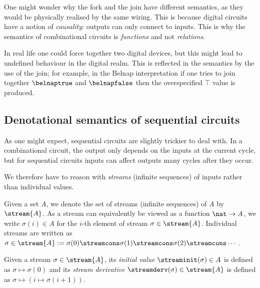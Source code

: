 \begin{remark}
    One might wonder why the fork and the join have different semantics, as they
    would be physically realised by the same wiring.
    This is because digital circuits have a notion of \emph{causality}: outputs
    can only connect to inputs.
    This is why the semantics of combinational circuits is \emph{functions} and
    not \emph{relations}.

    In real life one could force together two digital devices, but this might
    lead to undefined behaviour in the digital realm.
    This is reflected in the semantics by the use of the join; for example, in
    the Belnap interpretation if one tries to join together \(\belnaptrue\) and
    \(\belnapfalse\) then the overspecified \(\top\) value is produced.
\end{remark}

\subsection{Denotational semantics of sequential circuits}

As one might expect, sequential circuits are slightly trickier to deal with.
In a combinational circuit, the output only depends on the inputs at the current
cycle, but for sequential circuits inputs can affect outputs many cycles after
they occur.

We therefore have to reason with \emph{streams} (infinite sequences) of inputs
rather than individual values.

\begin{notation}
    Given a set \(A\), we denote the set of streams (infinite sequences) of
    \(A\) by \(\stream{A}\).
    As a stream can equivalently be viewed as a function \(\nat \to A\), we
    write \(\sigma(i) \in A\) for the \(i\)-th element of stream
    \(\sigma \in \stream{A}\).
    Individual streams are written as \(
        \sigma \in \stream{A}
        :=
        \sigma(0) \streamcons \sigma(1) \streamcons
        \sigma(2) \streamcons \cdots
    \).
\end{notation}

\begin{definition}\label{def:stream-operations}
    Given a stream \(\sigma \in \stream{A}\), its \emph{initial value}
    \(\streaminit(\sigma) \in A\) is defined as \(\sigma \mapsto \sigma(0)\)
    and its \emph{stream derivative} \(\streamderv(\sigma) \in \stream{A}\) is
    defined as \(\sigma \mapsto (i \mapsto \sigma(i+1))\).
\end{definition}

